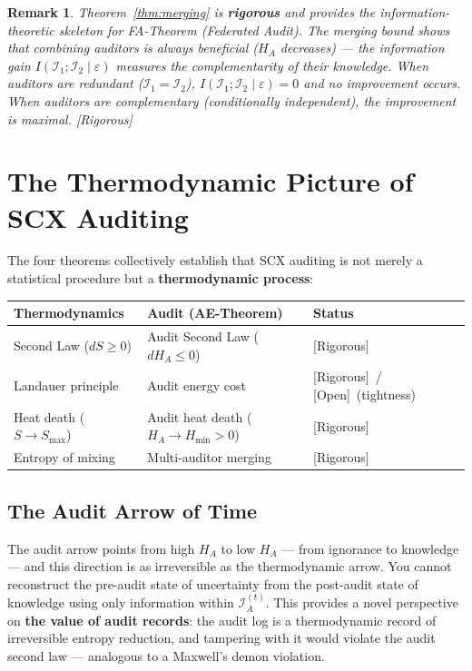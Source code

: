 \documentclass[12pt,a4paper]{article}
\newtheorem{remark}[theorem]{Remark}
\newcommand{\rigorous}{\textcolor{green!50!black}{\small\textsf{[Rigorous]}}}
\newcommand{\openquest}{\textcolor{red!70!black}{\small\textsf{[Open]}}}
\newcommand{\cI}{\mathcal{I}}
\begin{document}
\begin{remark}
Theorem~\ref{thm:merging} is \textbf{rigorous} and provides the
information-theoretic skeleton for FA-Theorem (Federated Audit).  The merging
bound shows that combining auditors is always beneficial ($H_A$ decreases) —
the information gain $I(\cI_1;\cI_2\mid\varepsilon)$ measures the
complementarity of their knowledge.  When auditors are \emph{redundant}
($\cI_1=\cI_2$), $I(\cI_1;\cI_2\mid\varepsilon)=0$ and no improvement occurs.
When auditors are \emph{complementary} (conditionally independent), the
improvement is maximal.  \rigorous
\end{remark}

\section{The Thermodynamic Picture of SCX Auditing}

The four theorems collectively establish that SCX auditing is not merely a
statistical procedure but a \textbf{thermodynamic process}:

\begin{center}
\begin{tabular}{@{}lll@{}}
\toprule
\textbf{Thermodynamics} & \textbf{Audit (AE-Theorem)} & \textbf{Status} \\
\midrule
Second Law ($dS\geq0$) & Audit Second Law ($dH_A\leq0$) & \rigorous \\
Landauer principle & Audit energy cost & \rigorous~/ \openquest~(tightness) \\
Heat death ($S\to S_{\max}$) & Audit heat death ($H_A\to H_{\min}>0$) & \rigorous \\
Entropy of mixing & Multi-auditor merging & \rigorous \\
\bottomrule
\end{tabular}
\end{center}

\subsection{The Audit Arrow of Time}

The audit arrow points from high $H_A$ to low $H_A$ — from ignorance to
knowledge — and this direction is as irreversible as the thermodynamic arrow.
You cannot reconstruct the pre-audit state of uncertainty from the post-audit
state of knowledge using only information within $\cI_A^{(t)}$.  This provides
a novel perspective on \textbf{the value of audit records}: the audit log is a
thermodynamic record of irreversible entropy reduction, and tampering with it
would violate the audit second law — analogous to a Maxwell's demon violation.
\end{document}

